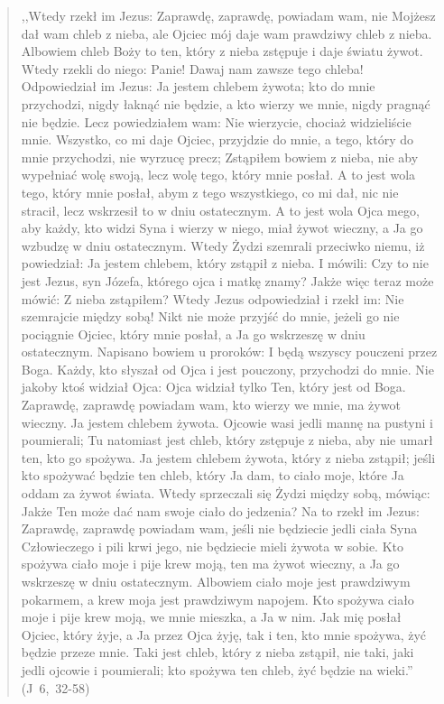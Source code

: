 \documentclass[10pt,a4paper,oneside]{article}
\begin{document}
\begin{quote}
,,Wtedy rzekł im Jezus: Zaprawdę, zaprawdę, powiadam wam, nie Mojżesz dał wam chleb z nieba, ale Ojciec mój daje wam prawdziwy chleb z nieba. Albowiem chleb Boży to ten, który z nieba zstępuje i daje światu żywot. Wtedy rzekli do niego: Panie! Dawaj nam zawsze tego chleba! Odpowiedział im Jezus: Ja jestem chlebem żywota; kto do mnie przychodzi, nigdy łaknąć nie będzie, a kto wierzy we mnie, nigdy pragnąć nie będzie. Lecz powiedziałem wam: Nie wierzycie, chociaż widzieliście mnie. Wszystko, co mi daje Ojciec, przyjdzie do mnie, a tego, który do mnie przychodzi, nie wyrzucę precz; Zstąpiłem bowiem z nieba, nie aby wypełniać wolę swoją, lecz wolę tego, który mnie posłał. A to jest wola tego, który mnie posłał, abym z tego wszystkiego, co mi dał, nic nie stracił, lecz wskrzesił to w dniu ostatecznym. A to jest wola Ojca mego, aby każdy, kto widzi Syna i wierzy w niego, miał żywot wieczny, a Ja go wzbudzę w dniu ostatecznym. Wtedy Żydzi szemrali przeciwko niemu, iż powiedział: Ja jestem chlebem, który zstąpił z nieba. I mówili: Czy to nie jest Jezus, syn Józefa, którego ojca i matkę znamy? Jakże więc teraz może mówić: Z nieba zstąpiłem? Wtedy Jezus odpowiedział i rzekł im: Nie szemrajcie między sobą! Nikt nie może przyjść do mnie, jeżeli go nie pociągnie Ojciec, który mnie posłał, a Ja go wskrzeszę w dniu ostatecznym. Napisano bowiem u proroków: I będą wszyscy pouczeni przez Boga. Każdy, kto słyszał od Ojca i jest pouczony, przychodzi do mnie. Nie jakoby ktoś widział Ojca: Ojca widział tylko Ten, który jest od Boga. Zaprawdę, zaprawdę powiadam wam, kto wierzy we mnie, ma żywot wieczny. Ja jestem chlebem żywota. Ojcowie wasi jedli mannę na pustyni i poumierali; Tu natomiast jest chleb, który zstępuje z nieba, aby nie umarł ten, kto go spożywa. Ja jestem chlebem żywota, który z nieba zstąpił; jeśli kto spożywać będzie ten chleb, który Ja dam, to ciało moje, które Ja oddam za żywot świata. Wtedy sprzeczali się Żydzi między sobą, mówiąc: Jakże Ten może dać nam swoje ciało do jedzenia? Na to rzekł im Jezus: Zaprawdę, zaprawdę powiadam wam, jeśli nie będziecie jedli ciała Syna Człowieczego i pili krwi jego, nie będziecie mieli żywota w sobie. Kto spożywa ciało moje i pije krew moją, ten ma żywot wieczny, a Ja go wskrzeszę w dniu ostatecznym. Albowiem ciało moje jest prawdziwym pokarmem, a krew moja jest prawdziwym napojem. Kto spożywa ciało moje i pije krew moją, we mnie mieszka, a Ja w nim. Jak mię posłał Ojciec, który żyje, a Ja przez Ojca żyję, tak i ten, kto mnie spożywa, żyć będzie przeze mnie. Taki jest chleb, który z nieba zstąpił, nie taki, jaki jedli ojcowie i poumierali; kto spożywa ten chleb, żyć będzie na wieki.'' (J~6,~32-58)
\end{quote}
\end{document}
